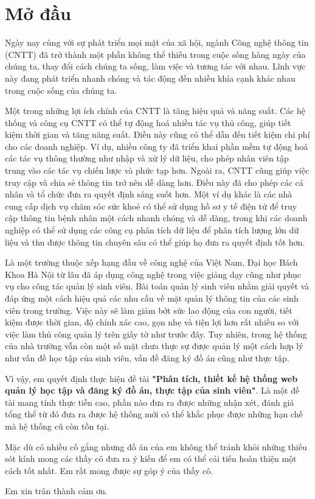 \chapter*{Mở đầu}
Ngày nay cùng với sự phát triển mọi mặt của xã hội, ngành Công nghệ thông tin (CNTT) đã trở thành một phần không thể thiếu trong cuộc sống hàng ngày của chúng ta, thay đổi cách chúng ta sống, làm việc và tương tác với nhau.
Lĩnh vực này đang phát triển nhanh chóng và tác động đến nhiều khía cạnh khác nhau trong cuộc sống của chúng ta.

Một trong những lợi ích chính của CNTT là tăng hiệu quả và năng suất. Các hệ thống và công cụ CNTT có thể tự động hoá nhiều tác vụ thủ công, giúp tiết kiệm thời gian và tăng năng suất.
Điều này cũng có thể dẫn đến tiết kiệm chi phí cho các doanh nghiệp. Ví dụ, nhiều công ty đã triển khai phần mềm tự động hoá các tác vụ thông thường như nhập và xử lý dữ liệu, cho phép nhân viên tập trung vào các tác vụ chiến lược và phức tạp hơn.
Ngoài ra, CNTT cũng giúp việc truy cập và chia sẻ thông tin trở nên dễ dàng hơn. Điều này đã cho phép các cá nhân và tổ chức đưa ra quyết định sáng suốt hơn. 
Một ví dụ khác là các nhà cung cấp dịch vụ chăm sóc sức khoẻ có thể sử dụng hồ sơ y tế điện tử để truy cập thông tin bệnh nhân một cách nhanh chóng và dễ dàng, trong khi các doanh nghiệp có thể sử dụng các công cụ phân tích dữ liệu để phân tích lượng lớn dữ liệu và thu được thông tin chuyên sâu có thể giúp họ đưa ra quyết định tốt hơn.

Là một trường thuộc xếp hạng đầu về công nghệ của Việt Nam, Đại học Bách Khoa Hà Nội từ lâu đã áp dụng công nghệ trong việc giảng dạy cũng như phục vụ cho công tác quản lý sinh viên.
Bài toán quản lý sinh viên nhằm giải quyết và đáp ứng một cách hiệu quả các nhu cầu về mặt quản lý thông tin của các sinh viên trong trường.
Việc này sẽ làm giảm bớt sức lao động của con người, tiết kiệm được thời gian, độ chính xác cao, gọn nhẹ và tiện lợi hơn rất nhiều so với việc làm thủ công quản lý trên giấy tờ như trước đây.
Tuy nhiên, trong hệ thống của nhà trường vẫn còn một số mặt chưa thực sự được quản lý một cách hợp lý như vấn đề học tập của sinh viên, vấn đề đăng ký đồ án cũng như thực tập.

Vì vậy, em quyết định thực hiện đề tài \textbf{"Phân tích, thiết kế hệ thống web quản lý học tập và đăng ký đồ án, thực tập của sinh viên"}.
Là một đề tài mang tính thực tiễn cao, phần nào đưa ra được những nhận xét, đánh giá tổng thể từ đó đưa ra được hệ thống mới có thể khắc phục được những hạn chế mà hệ thống cũ còn tồn tại.

Mặc dù có nhiều cố gắng nhưng đồ án của em không thể tránh khỏi những thiếu sót kính mong các thầy cô đưa ra ý kiến để em có thể cải tiến hoàn thiện một cách tốt nhất.
Em rất mong được sự góp ý của thầy cô.

Em xin trân thành cảm ơn.
